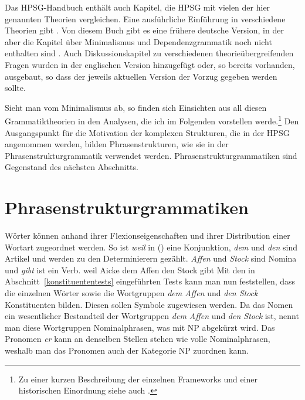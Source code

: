 \noindent
Das HPSG-Handbuch \citep{HPSGHandbook} enthält auch Kapitel, die HPSG mit vielen der hier genannten
Theorien vergleichen. Eine ausführliche Einführung in verschiedene Theorien gibt
\citet{MuellerGT-Eng}. Von diesem Buch gibt es eine frühere deutsche Version, in der aber die Kapitel
über Minimalismus und Dependenzgrammatik noch nicht enthalten sind \citep{MuellerGTBuch}. Auch
Diskussionskapitel zu verschiedenen theorieübergreifenden Fragen wurden in der englischen Version
hinzugefügt oder, so bereits vorhanden, ausgebaut, so dass der jeweils aktuellen Version
der Vorzug gegeben werden sollte.

Sieht man vom Minimalismus ab, so finden sich Einsichten aus all diesen Grammatiktheorien
in den Analysen, die ich im Folgenden vorstellen werde.\footnote{
  Zu einer kurzen Beschreibung der einzelnen Frameworks und einer historischen Einordnung
  siehe auch .%
}
Den Ausgangspunkt für die Motivation
der komplexen Strukturen, die in der HPSG angenommen werden, bilden Phrasenstrukturen, wie sie
in der Phrasenstrukturgrammatik verwendet werden. Phrasenstrukturgrammatiken sind Gegenstand des
nächsten Abschnitts.


\section{Phrasenstrukturgrammatiken}
\label{sec-psg}

Wörter können anhand ihrer Flexionseigenschaften und ihrer Distribution einer Wortart zugeordnet werden.
So ist \emph{weil} in () eine Konjunktion, \emph{dem} und \emph {den}
sind Artikel und werden zu den Determinierern gezählt. \emph{Affen} und \emph{Stock} sind Nomina und \emph{gibt}
ist ein Verb.
\ea
\label{bsp-weil-Aicke-dem-Affen-den-Stock-gibt}
weil Aicke dem Affen den Stock gibt
\z
Mit den in Abschnitt~\ref{konstituententests} eingeführten Tests kann man nun feststellen, dass
die einzelnen Wörter sowie die Wortgruppen \emph{dem Affen} und \emph{den Stock} Konstituenten bilden.
Diesen sollen Symbole zugewiesen werden. Da das Nomen ein wesentlicher Bestandteil der Wortgruppen
\emph{dem Affen} und \emph{den Stock} ist, nennt man diese Wortgruppen Nominalphrasen, was mit NP abgekürzt wird. Das Pronomen \emph{er}
kann an denselben Stellen stehen wie volle Nominalphrasen, weshalb man das Pronomen auch der
Kategorie NP zuordnen kann.

